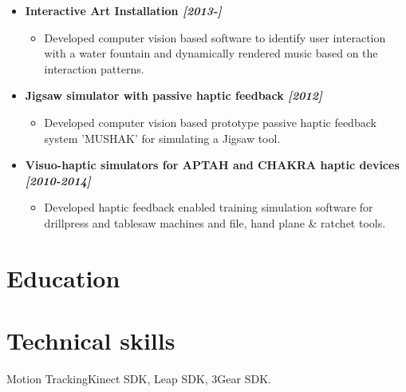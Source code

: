 \documentclass[11pt,a4paper,sans]{moderncv}        %
\begin{document}
{\begin{itemize}
  \begin{itemize}%
  \item Gesture interaction using the Leap motion sensor \& zSpace virtual holographic display for interactive labeling and assembly operations. 
  \end{itemize}
\item \textbf{Interactive Art Installation \textit{[2013-]}}
  \begin{itemize}%
  \item Developed computer vision based software to identify user interaction with a water fountain and dynamically rendered music based on the interaction patterns.
  \end{itemize}  
\item \textbf{Jigsaw simulator with passive haptic feedback  \textit{[2012]}}
  \begin{itemize}%
  \item Developed computer vision based prototype passive haptic feedback system 'MUSHAK' for simulating a Jigsaw tool.
  \end{itemize}
\item \textbf{Visuo-haptic simulators for APTAH and CHAKRA haptic devices \textit{[2010-2014]}}
  \begin{itemize}%
  \item Developed haptic feedback enabled training simulation software for drillpress and tablesaw machines and file, hand plane \& ratchet tools.
  \end{itemize}  
\end{itemize}}

\section{Education}

\section{Technical skills}
 {Motion Tracking}{Kinect SDK, Leap SDK, 3Gear SDK.}
\end{document}
